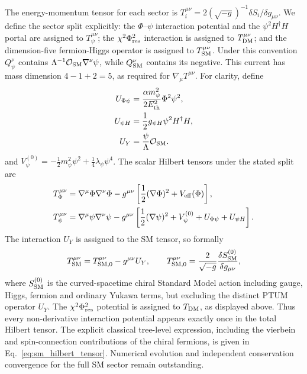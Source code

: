 \documentclass[epj]{svjour}
\begin{document}
The energy-momentum tensor for each sector is
$T_i^{\mu\nu}=2(\sqrt{-g})^{-1}\delta S_i/\delta g_{\mu\nu}$.
We define the sector split explicitly: the $\Phi$--$\psi$ interaction
potential and the $\psi^2H^\dagger H$ portal are assigned to
$T_\psi^{\mu\nu}$; the $\chi^2\Phi_{\rm res}^2$ interaction is
assigned to $T_{\rm DM}^{\mu\nu}$; and the dimension-five
fermion-Higgs operator is assigned to $T_{\rm SM}^{\mu\nu}$.
Under this convention $Q_\psi^\nu$ contains
$\Lambda^{-1}\mathcal{O}_{\rm SM}\nabla^\nu\psi$, while
$Q_{\rm SM}^\nu$ contains its negative. This current has mass
dimension $4-1+2=5$, as required for
$\nabla_\mu T^{\mu\nu}$.
For clarity, define
\[
\begin{aligned}
U_{\Phi\psi}&=\frac{\alpha m_\psi^2}{2E_{\rm th}^2}\Phi^2\psi^2,\\
U_{\psi H}&=\frac12g_{\psi H}\psi^2H^\dagger H,\\
U_Y&=\frac{\psi}{\Lambda}\mathcal O_{\rm SM}.
\end{aligned}
\]
and $V_\psi^{(0)}=-\tfrac12m_\psi^2\psi^2+
\tfrac14\lambda_\psi\psi^4$. The scalar Hilbert tensors under
the stated split are
\begin{align}
T_\Phi^{\mu\nu}
&=\nabla^\mu\Phi\nabla^\nu\Phi
-g^{\mu\nu}\left[\frac12(\nabla\Phi)^2+V_{\rm eff}(\Phi)\right],
\\
T_\psi^{\mu\nu}
&=\nabla^\mu\psi\nabla^\nu\psi
-g^{\mu\nu}\left[\frac12(\nabla\psi)^2
+V_\psi^{(0)}+U_{\Phi\psi}+U_{\psi H}\right].
\end{align}
The interaction $U_Y$ is assigned to the SM tensor, so formally
\[
T_{\rm SM}^{\mu\nu}
=T_{{\rm SM},0}^{\mu\nu}-g^{\mu\nu}U_Y,
\qquad
T_{{\rm SM},0}^{\mu\nu}
=\frac{2}{\sqrt{-g}}\frac{\delta S_{\rm SM}^{(0)}}{\delta g_{\mu\nu}},
\]
where $S_{\rm SM}^{(0)}$ is the curved-spacetime chiral Standard
Model action including gauge, Higgs, fermion and ordinary Yukawa
terms, but excluding the distinct PTUM operator $U_Y$. The
$\chi^2\Phi_{\rm res}^2$ potential is assigned to $T_{\rm DM}$,
as displayed above. Thus every non-derivative interaction
potential appears exactly once in the total Hilbert tensor.
The explicit classical tree-level expression, including the
vierbein and spin-connection contributions of the chiral fermions,
is given in Eq.~\eqref{eq:sm_hilbert_tensor}. Numerical evolution
and independent conservation convergence for the full SM sector
remain outstanding.
\end{document}
